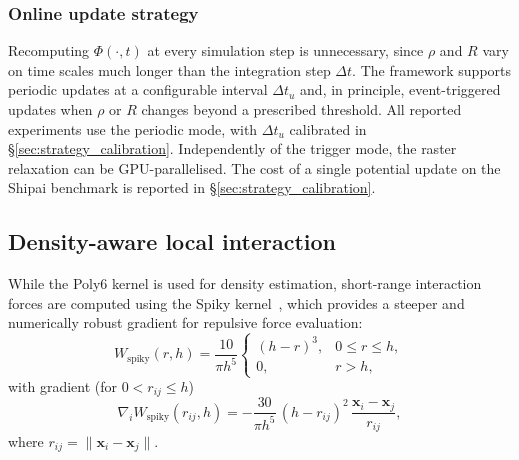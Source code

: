 \documentclass[preprint,12pt]{elsarticle}
\providecommand{\FloatBarrier}{}
\let\origsubsection\subsection
\renewcommand{\subsection}{\FloatBarrier\origsubsection}
\let\origsubsubsection\subsubsection
\renewcommand{\subsubsection}{\FloatBarrier\origsubsubsection}
\begin{document}
\subsubsection{Online update strategy}
\label{sec:online_update}

Recomputing $\Phi(\cdot, t)$ at every simulation step is unnecessary,
since $\rho$ and $R$ vary on time scales much longer than the
integration step $\Delta t$. The framework supports periodic updates at
a configurable interval $\Delta t_u$ and, in principle, event-triggered
updates when $\rho$ or $R$ changes beyond a prescribed threshold. All
reported experiments use the periodic mode, with $\Delta t_u$ calibrated
in \S\ref{sec:strategy_calibration}. Independently of the trigger mode,
the raster relaxation can be GPU-parallelised. The cost of a single potential update on the Shipai
benchmark is reported in \S\ref{sec:strategy_calibration}.



\subsection{Density-aware local interaction}
\label{sec:interaction_model}

While the Poly6 kernel is used for density estimation, short-range
interaction forces are computed using the Spiky
kernel~\citep{muller2003particle}, which provides a steeper and
numerically robust gradient for repulsive force evaluation:
\begin{equation}
W_{\mathrm{spiky}}(r, h) = \frac{10}{\pi h^5}
\begin{cases}
(h - r)^3, & 0 \le r \le h,\\
0, & r > h,
\end{cases}
\label{eq:spiky_kernel}
\end{equation}
with gradient (for $0 < r_{ij} \le h$)
\begin{equation}
\nabla_i W_{\mathrm{spiky}}(r_{ij}, h)
= -\frac{30}{\pi h^5}\,(h - r_{ij})^2\,
\frac{\mathbf{x}_i - \mathbf{x}_j}{r_{ij}},
\label{eq:spiky_gradient}
\end{equation}
where $r_{ij} = \|\mathbf{x}_i - \mathbf{x}_j\|$.
\end{document}
